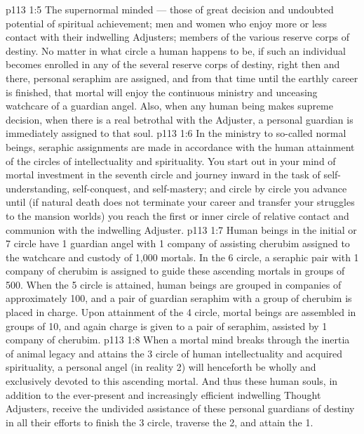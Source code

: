 \vs p113 1:5 \bibnobreakspace The supernormal minded --- those of great decision and undoubted potential of spiritual achievement; men and women who enjoy more or less contact with their indwelling Adjusters; members of the various reserve corps of destiny. No matter in what circle a human happens to be, if such an individual becomes enrolled in any of the several reserve corps of destiny, right then and there, personal seraphim are assigned, and from that time until the earthly career is finished, that mortal will enjoy the continuous ministry and unceasing watchcare of a guardian angel. Also, when any human being makes  supreme decision, when there is a real betrothal with the Adjuster, a personal guardian is immediately assigned to that soul.
\vs p113 1:6 \pc In the ministry to so\hyp{}called normal beings, seraphic assignments are made in accordance with the human attainment of the circles of intellectuality and spirituality. You start out in your mind of mortal investment in the seventh circle and journey inward in the task of self\hyp{}understanding, self\hyp{}conquest, and self\hyp{}mastery; and circle by circle you advance until (if natural death does not terminate your career and transfer your struggles to the mansion worlds) you reach the first or inner circle of relative contact and communion with the indwelling Adjuster.
\vs p113 1:7 Human beings in the initial or 7 circle have 1 guardian angel with 1 company of assisting cherubim assigned to the watchcare and custody of 1,000 mortals. In the 6 circle, a seraphic pair with 1 company of cherubim is assigned to guide these ascending mortals in groups of 500. When the 5 circle is attained, human beings are grouped in companies of approximately 100, and a pair of guardian seraphim with a group of cherubim is placed in charge. Upon attainment of the 4 circle, mortal beings are assembled in groups of 10, and again charge is given to a pair of seraphim, assisted by 1 company of cherubim.
\vs p113 1:8 When a mortal mind breaks through the inertia of animal legacy and attains the 3 circle of human intellectuality and acquired spirituality, a personal angel (in reality 2) will henceforth be wholly and exclusively devoted to this ascending mortal. And thus these human souls, in addition to the ever\hyp{}present and increasingly efficient indwelling Thought Adjusters, receive the undivided assistance of these personal guardians of destiny in all their efforts to finish the 3 circle, traverse the 2, and attain the 1.
